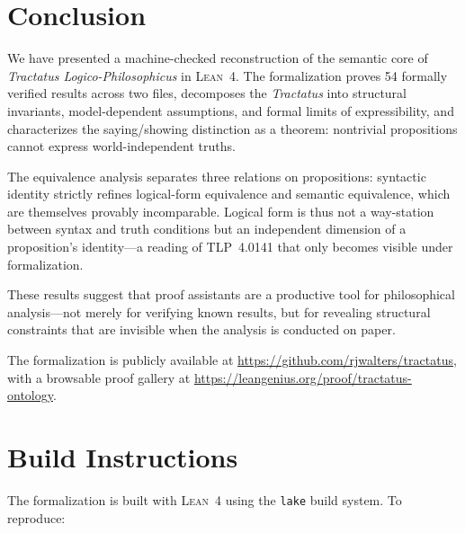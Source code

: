 \documentclass[10pt, letterpaper]{article}
\theoremstyle{definition}
\theoremstyle{remark}
\newcommand{\Lean}{\textsc{Lean}}
\begin{document}
\section{Conclusion}
\label{sec:conclusion}

We have presented a machine-checked reconstruction of the
semantic core of \emph{Tractatus Logico-Philosophicus} in
\Lean~4.  The formalization proves 54 formally verified results
across two files, decomposes the
\emph{Tractatus} into structural invariants, model-dependent
assumptions, and formal limits of expressibility, and
characterizes the saying/showing distinction as a theorem:
nontrivial propositions cannot express world-independent truths.

The equivalence analysis separates three relations on
propositions: syntactic identity strictly refines logical-form
equivalence and semantic equivalence, which are themselves
provably incomparable.  Logical form is thus not a way-station
between syntax and truth conditions but an independent dimension
of a proposition's identity---a reading of TLP~4.0141 that only
becomes visible under formalization.

These results suggest that proof assistants are a productive tool
for philosophical analysis---not merely for verifying known
results, but for revealing structural constraints that are
invisible when the analysis is conducted on paper.

The formalization is publicly available at
\url{https://github.com/rjwalters/tractatus}, with a
browsable proof gallery at
\url{https://leangenius.org/proof/tractatus-ontology}.


\appendix

\section{Build Instructions}
\label{app:build}

The formalization is built with \Lean~4 using the \texttt{lake}
build system.  To reproduce:
\end{document}
